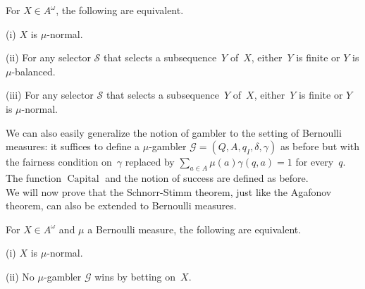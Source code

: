 \documentclass[11pt]{article}
\renewcommand{\S}{\mathcal{S}}
\newcommand{\G}{\mathcal{G}}
\DeclareMathOperator{\capital}{Capital}
\begin{document}
\begin{theorem} \label{thm:agafonov-bernoulli}
For $X \in A^\omega$, the following are equivalent.
\item[(i)] $X$ is $\mu$-normal. 
\item[(ii)] For any selector $\S$ that selects a subsequence~$Y$ of~$X$, either~$Y$ is finite or $Y$ is $\mu$-balanced.
\item[(iii)] For any selector $\S$ that selects a subsequence~$Y$ of~$X$, either~$Y$ is finite or $Y$ is $\mu$-normal.
\end{theorem}


We can also easily generalize the notion of gambler to the setting of Bernoulli measures: it suffices to define a $\mu$-gambler $\G=(Q,A,q_I,\delta,\gamma)$ as before but with the fairness condition on~$\gamma$ replaced by $\sum_{a \in A} \mu(a)\gamma(q,a) =1$ for every~$q$. The function $\capital$ and the notion of success are defined as before. \\ 

We will now prove that the Schnorr-Stimm theorem, just like the Agafonov theorem, can also be extended to Bernoulli measures. 


\begin{theorem} \label{thm:schnorr-stimm-bernoulli}
For $X \in A^\omega$ and $\mu$ a Bernoulli measure, the following are equivalent.
\item[(i)] $X$ is $\mu$-normal. 
\item[(ii)] No $\mu$-gambler $\G$ wins by betting on~$X$.  
\end{theorem}
\end{document}
